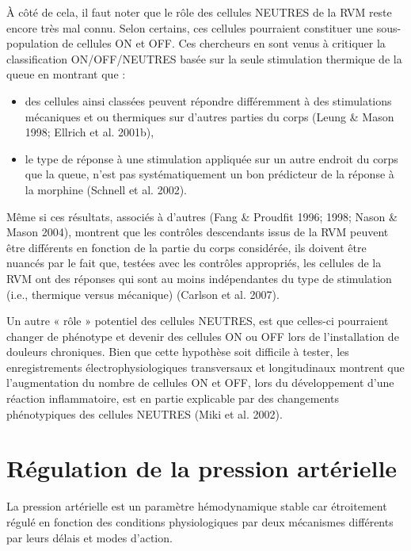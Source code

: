 \documentclass[a4paper,12pt,twoside]{report}
\begin{document}
\bigskip

\`A côté de cela, il faut noter que le rôle des cellules NEUTRES de la RVM reste encore très mal connu. Selon certains, ces cellules pourraient constituer une sous-population de cellules ON et OFF. Ces chercheurs en sont venus à critiquer la classification ON/OFF/NEUTRES basée sur la seule stimulation thermique de la queue en montrant que : 

\begin{itemize}
\item des cellules ainsi classées peuvent répondre différemment à des stimulations mécaniques et ou thermiques sur d’autres parties du corps (Leung \& Mason 1998; Ellrich et al. 2001b),
\item le type de réponse à une stimulation appliquée sur un autre endroit du corps que la queue, n’est pas systématiquement un bon prédicteur de la réponse à la morphine (Schnell et al. 2002). 
\end{itemize}

Même si ces résultats, associés à d’autres (Fang \& Proudfit 1996; 1998; Nason \& Mason 2004), montrent que les contrôles descendants issus de la RVM peuvent être différents en fonction de la partie du corps considérée, ils doivent être nuancés par le fait que, testées avec les contrôles appropriés, les cellules de la RVM ont des réponses qui sont au moins indépendantes du type de stimulation (i.e., thermique versus mécanique) (Carlson et al. 2007).

Un autre « rôle » potentiel des cellules NEUTRES, est que celles-ci pourraient changer de phénotype et devenir des cellules ON ou OFF lors de l’installation de douleurs chroniques. Bien que cette hypothèse soit difficile à tester, les enregistrements électrophysiologiques transversaux et longitudinaux montrent que l’augmentation du nombre de cellules ON et OFF, lors du développement d’une réaction inflammatoire, est en partie explicable par des changements phénotypiques des cellules NEUTRES (Miki et al. 2002). 

\cleardoublepage

\chapter{Régulation de la pression artérielle}

La pression artérielle est un paramètre hémodynamique stable car étroitement régulé en fonction des conditions physiologiques par deux mécanismes différents par leurs délais et modes d’action.
\end{document}
